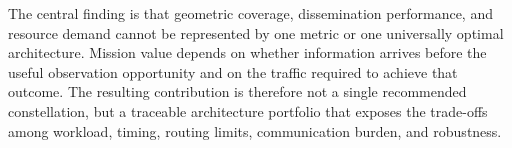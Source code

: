 The central finding is that geometric coverage, dissemination performance, and resource demand cannot be represented by one metric or one universally optimal architecture. Mission value depends on whether information arrives before the useful observation opportunity and on the traffic required to achieve that outcome. The resulting contribution is therefore not a single recommended constellation, but a traceable architecture portfolio that exposes the trade-offs among workload, timing, routing limits, communication burden, and robustness.
